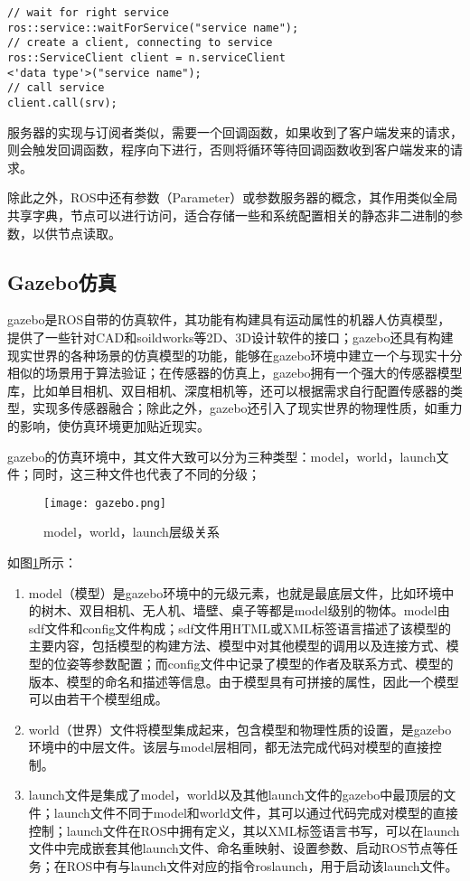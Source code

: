 \begin{verbatim}
// wait for right service
ros::service::waitForService("service name");
// create a client, connecting to service
ros::ServiceClient client = n.serviceClient
<'data type'>("service name");
// call service
client.call(srv);
\end{verbatim}

服务器的实现与订阅者类似，需要一个回调函数，如果收到了客户端发来的请求，则会触发回调函数，程序向下进行，否则将循环等待回调函数收到客户端发来的请求。

除此之外，ROS中还有参数（Parameter）或参数服务器的概念，其作用类似全局共享字典，节点可以进行访问，适合存储一些和系统配置相关的静态非二进制的参数，以供节点读取。


\subsection{Gazebo仿真} \label{2.1.2}
gazebo是ROS自带的仿真软件，其功能有构建具有运动属性的机器人仿真模型，提供了一些针对CAD和soildworks等2D、3D设计软件的接口；gazebo还具有构建现实世界的各种场景的仿真模型的功能，能够在gazebo环境中建立一个与现实十分相似的场景用于算法验证；在传感器的仿真上，gazebo拥有一个强大的传感器模型库，比如单目相机、双目相机、深度相机等，还可以根据需求自行配置传感器的类型，实现多传感器融合；除此之外，gazebo还引入了现实世界的物理性质，如重力的影响，使仿真环境更加贴近现实。

gazebo的仿真环境中，其文件大致可以分为三种类型：model，world，launch文件；同时，这三种文件也代表了不同的分级；

\begin{figure}[!ht]
	\centering
	\texttt{[image: gazebo.png]}
	\caption{model，world，launch层级关系} 
	\label{fig3}
\end{figure}

如图\ref{fig3}所示：
\begin{enumerate}
	\item model（模型）是gazebo环境中的元级元素，也就是最底层文件，比如环境中的树木、双目相机、无人机、墙壁、桌子等都是model级别的物体。model由sdf文件和config文件构成；sdf文件用HTML或XML标签语言描述了该模型的主要内容，包括模型的构建方法、模型中对其他模型的调用以及连接方式、模型的位姿等参数配置；而config文件中记录了模型的作者及联系方式、模型的版本、模型的命名和描述等信息。由于模型具有可拼接的属性，因此一个模型可以由若干个模型组成。
	\item
	world（世界）文件将模型集成起来，包含模型和物理性质的设置，是gazebo环境中的中层文件。该层与model层相同，都无法完成代码对模型的直接控制。
	\item 
	launch文件是集成了model，world以及其他launch文件的gazebo中最顶层的文件；launch文件不同于model和world文件，其可以通过代码完成对模型的直接控制；launch文件在ROS中拥有定义，其以XML标签语言书写，可以在launch文件中完成嵌套其他launch文件、命名重映射、设置参数、启动ROS节点等任务；在ROS中有与launch文件对应的指令roslaunch，用于启动该launch文件。
\end{enumerate}

